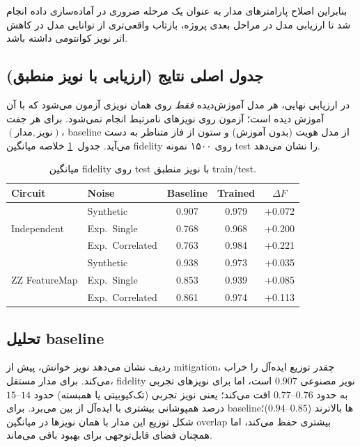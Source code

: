 بنابراین اصلاح پارامترهای مدار
به عنوان یک مرحله ضروری در آماده‌سازی داده انجام شد تا ارزیابی مدل در مراحل بعدی پروژه، بازتاب واقعی‌تری از توانایی مدل در کاهش اثر نویز کوانتومی داشته باشد.


\subsection{جدول اصلی نتایج (ارزیابی با نویز منطبق)}

در ارزیابی نهایی، هر مدل آموزش‌دیده \emph{فقط} روی همان نویزی آزمون می‌شود که با آن آموزش دیده است؛ آزمون روی نویزهای نامرتبط انجام نمی‌شود. برای هر جفت $(\text{مدار}, \text{نویز})$، baseline از مدل هویت (بدون آموزش) و ستون  از فاز متناظر به دست می‌آید. جدول~\ref{tab:main-fidelity} خلاصه میانگین fidelity روی ۱۵۰۰ نمونه test را نشان می‌دهد.

\begin{table}[htbp]
\centering
\caption{میانگین fidelity روی test با نویز منطبق train/test.}
\label{tab:main-fidelity}
\begin{tabular}{llccc}
\toprule
Circuit & Noise & Baseline & Trained & $\Delta F$\\
\midrule
\multirow{3}{*}{Independent}
& Synthetic & 0.907 & 0.979 & +0.072\\
& Exp.\ Single & 0.768 & 0.968 & +0.200\\
& Exp.\ Correlated & 0.763 & 0.984 & +0.221\\
\midrule
\multirow{3}{*}{ZZ FeatureMap}
& Synthetic & 0.938 & 0.973 & +0.035\\
& Exp.\ Single & 0.853 & 0.939 & +0.085\\
& Exp.\ Correlated & 0.861 & 0.974 & +0.113\\
\bottomrule
\end{tabular}
\end{table}

\subsection{تحلیل baseline}

ردیف  نشان می‌دهد نویز خوانش، پیش از mitigation، چقدر توزیع ایده‌آل را خراب می‌کند. برای مدار مستقل، fidelity نویز مصنوعی $0.907$ است، اما برای نویزهای تجربی به حدود $0.76$--$0.77$ افت می‌کند؛ یعنی نویز تجربی (تک‌کیوبیتی یا همبسته) حدود $14$--$15$ درصد همپوشانی بیشتری با ایده‌آل از بین می‌برد. برای  baselineها بالاترند ($0.85$--$0.94$)؛ شکل توزیع این مدار با همان نویزها در میانگین overlap بیشتری حفظ می‌کند، اما همچنان فضای قابل‌توجهی برای بهبود باقی می‌ماند.

